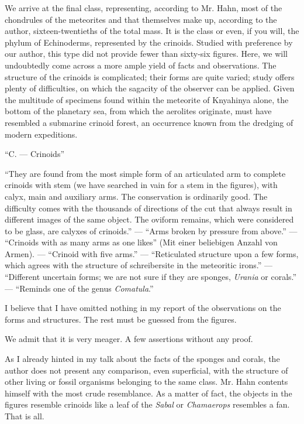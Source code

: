 \documentclass[a4paper, 12pt, oneside]{article}
\begin{document}
We arrive at the final class, representing, according to Mr. Hahn, most of the chondrules of the meteorites and that themselves make up, according to the author, sixteen-twentieths of the total mass. It is the class or even, if you will, the phylum of Echinoderms, represented by the crinoids. Studied with preference by our author, this type did not provide fewer than sixty-six figures. Here, we will undoubtedly come across a more ample yield of facts and observations. The structure of the crinoids is complicated; their forms are quite varied; study offers plenty of difficulties, on which the sagacity of the observer can be applied. Given the multitude of specimens found within the meteorite of Knyahinya alone, the bottom of the planetary sea, from which the aerolites originate, must have resembled a submarine crinoid forest, an occurrence known from the dredging of modern expeditions.

``C. --- Crinoids''

``They are found from the most simple form of an articulated arm to complete crinoids with stem (we have searched in vain for a stem in the figures), with calyx, main and auxiliary arms. The conservation is ordinarily good. The difficulty comes with the thousands of directions of the cut that always result in different images of the same object. The oviform remains, which were considered to be glass, are calyxes of crinoids.'' --- ``Arms broken by pressure from above.'' --- ``Crinoids with as many arms as one likes'' (Mit einer beliebigen Anzahl von Armen). --- ``Crinoid with five arms.'' --- ``Reticulated structure upon a few forms, which agrees with the structure of schreibersite in the meteoritic irons.'' --- ``Different uncertain forms; we are not sure if they are sponges, \emph{Urania} or corals.'' --- ``Reminds one of the genus \emph{Comatula}.''

I believe that I have omitted nothing in my report of the observations on the forms and structures. The rest must be guessed from the figures.

We admit that it is very meager. A few assertions without any proof.

As I already hinted in my talk about the facts of the sponges and corals, the author does not present any comparison, even superficial, with the structure of other living or fossil organisms belonging to the same class. Mr. Hahn contents himself with the most crude resemblance. As a matter of fact, the objects in the figures resemble crinoids like a leaf of the \emph{Sabal} or \emph{Chamaerops} resembles a fan. That is all.
\end{document}
